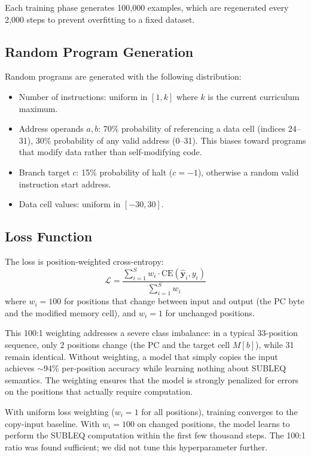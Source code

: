 \documentclass[11pt,a4paper]{article}
\begin{document}
Each training phase generates 100{,}000 examples, which are regenerated every 2{,}000 steps to prevent overfitting to a fixed dataset.

\subsection{Random Program Generation}

Random programs are generated with the following distribution:
\begin{itemize}[nosep]
  \item Number of instructions: uniform in $[1, k]$ where $k$ is the current curriculum maximum.
  \item Address operands $a, b$: 70\% probability of referencing a data cell (indices 24--31), 30\% probability of any valid address (0--31). This biases toward programs that modify data rather than self-modifying code.
  \item Branch target $c$: 15\% probability of halt ($c = -1$), otherwise a random valid instruction start address.
  \item Data cell values: uniform in $[-30, 30]$.
\end{itemize}

\subsection{Loss Function}
\label{sec:loss}

The loss is position-weighted cross-entropy:
\begin{equation}
  \mathcal{L} = \frac{\sum_{i=1}^{S} w_i \cdot \mathrm{CE}(\hat{\mathbf{y}}_i, y_i)}{\sum_{i=1}^{S} w_i}
\end{equation}
where $w_i = 100$ for positions that change between input and output (the PC byte and the modified memory cell), and $w_i = 1$ for unchanged positions.

This 100:1 weighting addresses a severe class imbalance: in a typical 33-position sequence, only 2 positions change (the PC and the target cell $M[b]$), while 31 remain identical.
Without weighting, a model that simply copies the input achieves $\sim$94\% per-position accuracy while learning nothing about SUBLEQ semantics.
The weighting ensures that the model is strongly penalized for errors on the positions that actually require computation.

\begin{observation}
With uniform loss weighting ($w_i = 1$ for all positions), training converges to the copy-input baseline.
With $w_i = 100$ on changed positions, the model learns to perform the SUBLEQ computation within the first few thousand steps.
The 100:1 ratio was found sufficient; we did not tune this hyperparameter further.
\end{observation}
\end{document}
